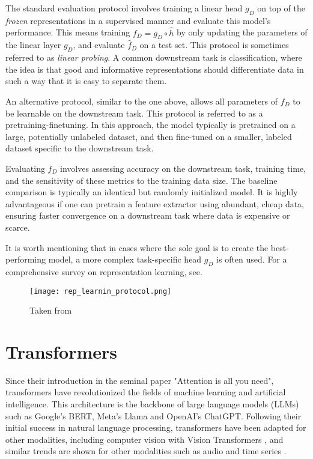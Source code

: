\documentclass[../../thesis.tex]{subfiles}
\begin{document}
The standard evaluation protocol involves training a linear head $g_D$ on top of the \textit{frozen} representations in a supervised manner and evaluate this model's performance. This means training $f_D = g_D\circ \widehat{h}$ by only updating the parameters of the linear layer $g_D$, and evaluate $\widehat{f}_D$ on a test set. This protocol is sometimes referred to as \textit{linear probing}. A common downstream task is classification, where the idea is that good and informative representations should differentiate data in such a way that it is easy to separate them. \newline

An alternative protocol, similar to the one above, allows all parameters of $f_D$ to be learnable on the downstream task. This protocol is referred to as a pretraining-finetuning. In this approach, the model typically is pretrained on a large, potentially unlabeled dataset, and then fine-tuned on a smaller, labeled dataset specific to the downstream task. \newline

Evaluating $f_D$ involves assessing accuracy on the downstream task, training time, and the sensitivity of these metrics to the training data size. The baseline comparison is typically an identical but randomly initialized model. It is highly advantageous if one can pretrain a feature extractor using abundant, cheap data, ensuring faster convergence on a downstream task where data is expensive or scarce.\newline

It is worth mentioning that in cases where the sole goal is to create the best-performing model, a more complex task-specific head $g_D$ is often used. For a comprehensive survey on representation learning, see\cite{nozawa2022empirical}.


\begin{figure}[h]
    \texttt{[image: rep\_learnin\_protocol.png]}
    \centering    
    \caption{Taken from \cite{nozawa2022empirical}}
\end{figure}


\section{Transformers}

Since their introduction in the seminal paper "Attention is all you need"\cite{vaswani2023attention}, transformers have revolutionized the fields of machine learning and artificial intelligence. This architecture is the backbone of large language models (LLMs) such as Google's BERT, Meta's Llama and OpenAI's ChatGPT. Following their initial success in natural language processing, transformers have been adapted for other modalities, including computer vision with Vision Transformers \cite{dosovitskiy2021image}, and similar trends are shown for other modalities such as audio \cite{latif2023transformers} and time series \cite{wen2023transformers}. \newline
\end{document}
